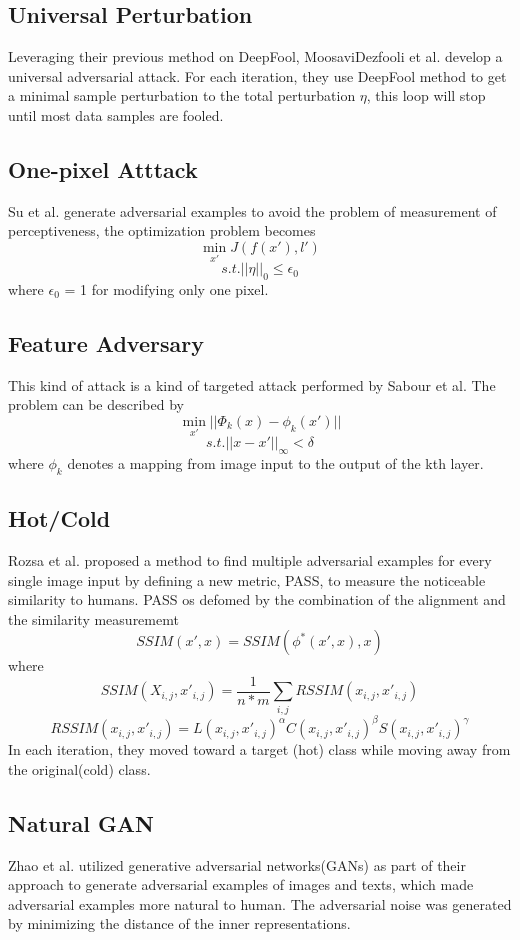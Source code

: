 \documentclass[twoside,twocolumn]{article}
\begin{document}
\subsection{Universal Perturbation}
Leveraging their previous method on DeepFool, MoosaviDezfooli et al. develop a universal adversarial attack. For each iteration, they use DeepFool method to get a minimal sample perturbation to the total perturbation $\eta$, this loop will stop until most data samples are fooled. 
\subsection{One-pixel Atttack}
Su et al. generate adversarial examples to avoid the problem of measurement of perceptiveness, the optimization problem becomes
$$\min_{x'}J(f(x'),l')$$
$$s.t. ||\eta||_0 \le \epsilon_0 $$
where $\epsilon_0$ = 1 for modifying only one pixel.
\subsection{Feature Adversary}
This kind of attack is a kind of targeted attack performed by Sabour et al. The problem can be described by
$$\min_{x'} ||\Phi_k(x) - \phi_k(x')||$$
$$s.t. ||x-x'||_{\infty} < \delta$$
where $\phi_k$ denotes a mapping from image input to the output of the kth layer.
\subsection{Hot/Cold}
Rozsa et al. proposed a method to find multiple adversarial examples for every single image input by defining a new metric, PASS, to measure the noticeable similarity to humans. PASS os defomed by the combination of the alignment and the similarity measurememt
$$SSIM(x', x) = SSIM(\phi^*(x', x), x)$$
where 
$$SSIM(X_{i,j}, x'_{i,j}) = \frac{1}{n*m}\sum_{i,j}^{}RSSIM(x_{i,j}, x'_{i,j})$$
$$RSSIM(x_{i,j}, x'_{i,j}) = L(x_{i,j}, x'_{i,j})^\alpha C(x_{i,j}, x'_{i,j})^\beta S(x_{i,j}, x'_{i,j})^\gamma$$
In each iteration, they moved toward a target (hot) class while moving away from the original(cold) class.
\subsection{Natural GAN}
Zhao et al. utilized generative adversarial networks(GANs) as part of their approach to generate adversarial examples of images and texts, which made adversarial examples more natural to human. The adversarial noise was generated by minimizing the distance of the inner representations. 
\end{document}
